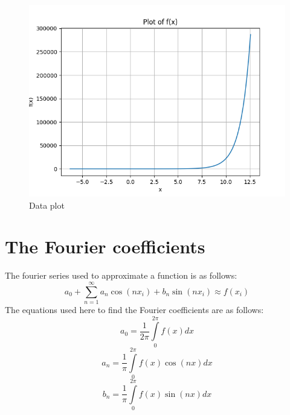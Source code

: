 \documentclass[11pt, a4paper]{article}
\begin{document}
   \begin{figure}[!tbh]
   	\centering
   	\includegraphics[scale=0.6]{Figure3.png}   
   	\caption{Data plot}
   	\label{fig:sample}
   \end{figure} 
   
 

\section{The Fourier coefficients}
The fourier series used to approximate a function is as follows:
\begin{equation}
    a_{0} + \sum\limits_{n=1}^{\infty} {{a_{n}\cos(nx_{i})+b_{n}\sin(nx_{i})}} \approx f(x_{i}) 
    \end{equation}
    	The equations used here to find the Fourier coefficients are as follows:
    \begin{equation}
         a_{0} = \frac{1}{2\pi}\int\limits_{0}^{2\pi} f(x)dx 
    \end{equation}
    \begin{equation}
         a_{n} = \frac{1}{\pi}\int\limits_{0}^{2\pi} f(x)\cos(nx)dx 
    \end{equation}
    \begin{equation}
         b_{n} = \frac{1}{\pi}\int\limits_{0}^{2\pi} f(x)\sin(nx)dx 
    \end{equation}
\end{document}
